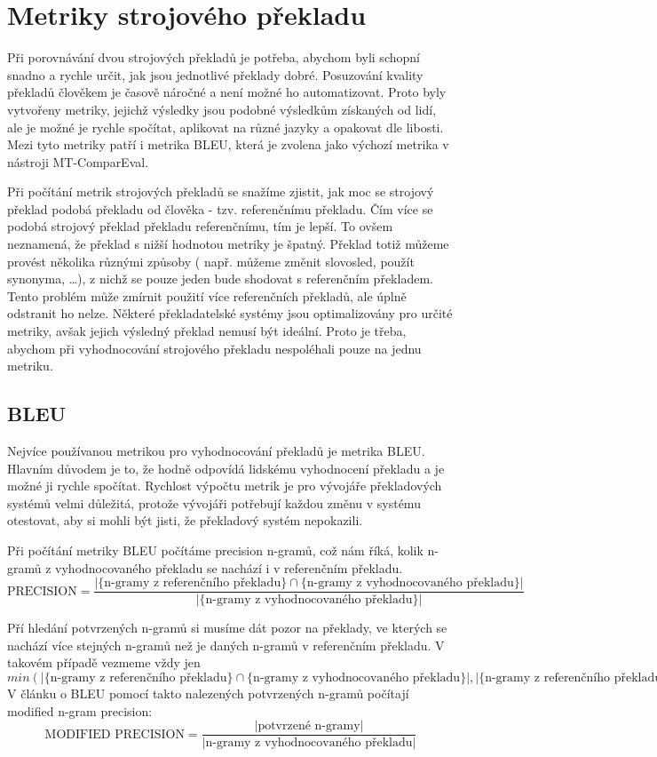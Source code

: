 \chapter{Metriky strojového překladu}
Při porovnávání dvou strojových překladů je potřeba,
  abychom byli schopní snadno a rychle určit,
  jak jsou jednotlivé překlady dobré.
Posuzování kvality překladů člověkem je časově náročné
  a není možné ho automatizovat.
Proto byly vytvořeny metriky,
  jejichž výsledky jsou podobné výsledkům získaných od lidí,
  ale je možné je rychle spočítat,
  aplikovat na různé jazyky a opakovat dle libosti.
Mezi tyto metriky patří i metrika BLEU,
  která je zvolena jako výchozí metrika v nástroji MT-ComparEval.

Při počítání metrik strojových překladů se snažíme zjistit,
  jak moc se strojový překlad podobá překladu od člověka - tzv. referenčnímu překladu.
Čím více se podobá strojový překlad překladu referenčnímu,
  tím je lepší.
To ovšem neznamená, že překlad s nižší hodnotou metriky je špatný.
Překlad totiž můžeme provést několika různými způsoby 
  ( např. můžeme změnit slovosled, použít synonyma, \dots ),
  z nichž se pouze jeden bude shodovat s referenčním překladem.
Tento problém může zmírnit použití více referenčních překladů,
  ale úplně odstranit ho nelze.
Některé překladatelské systémy jsou optimalizovány pro určité metriky,
  avšak jejich výsledný překlad nemusí být ideální.
Proto je třeba,
  abychom při vyhodnocování strojového překladu nespoléhali pouze na jednu metriku.

\section{BLEU}
Nejvíce používanou metrikou pro vyhodnocování překladů je metrika BLEU.
Hlavním důvodem je to,
  že hodně odpovídá lidskému vyhodnocení překladu
  a je možné ji rychle spočítat.
Rychlost výpočtu metrik je pro vývojáře překladových systémů velmi důležitá,
  protože vývojáři potřebují každou změnu v systému otestovat,
  aby si mohli být jisti,
  že překladový systém nepokazili.

Při počítání metriky BLEU počítáme precision n-gramů,
  což nám říká,
  kolik n-gramů z vyhodnocovaného překladu se nachází i v referenčním překladu.	
$$ \text{PRECISION} = \frac{\lvert \lbrace \text{n-gramy z referenčního překladu} \rbrace \cap \lbrace \text{n-gramy z vyhodnocovaného překladu} \rbrace \rvert}{\lvert \lbrace \text{n-gramy z vyhodnocovaného překladu} \rbrace \rvert}$$

Pří hledání potvrzených n-gramů si musíme dát pozor na překlady,
  ve kterých se nachází více stejných n-gramů než je daných n-gramů v referenčním překladu.
V takovém případě vezmeme vždy jen
  $min( \lvert \lbrace \text{n-gramy z referenčního překladu} \rbrace \cap \lbrace \text{n-gramy z vyhodnocovaného překladu} \rbrace \rvert, \lvert \lbrace \text{n-gramy z referenčního překladu} \rbrace \rvert )$
V článku o BLEU pomocí takto nalezených potvrzených n-gramů počítají modified n-gram precision:
$$ \text{MODIFIED PRECISION} = \frac{ \lvert \text{potvrzené n-gramy} \rvert }{ \lvert \text{n-gramy z vyhodnocovaného překladu} \rvert } $$




